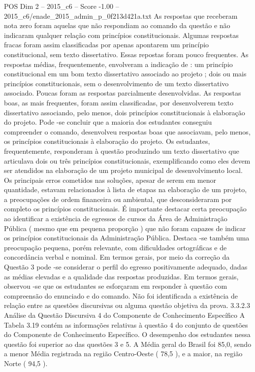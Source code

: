 \begin{textsample}{POS Dim 2 – 2015\_c6 – Score -1.00 – 2015\_c6/enade\_2015\_admin\_p\_0f213d421a.txt}
As respostas que receberam nota zero foram aquelas que não respondiam ao comando da questão e não indicaram qualquer relação com princípios constitucionais.
Algumas respostas fracas foram assim classificadas por apenas apontarem um princípio constitucional, sem texto dissertativo.
Essas repostas foram pouco frequentes.
As respostas médias, frequentemente, envolveram a indicação de : um princípio constitucional em um bom texto dissertativo associado ao projeto ; dois ou mais princípios constitucionais, sem o desenvolvimento de um texto dissertativo associado.
Poucas foram as respostas parcialmente desenvolvidas.
As respostas boas, as mais frequentes, foram assim classificadas, por desenvolverem texto dissertativo associando, pelo menos, dois princípios constitucionais à elaboração do projeto.
Pode -se concluir que a maioria dos estudantes conseguiu compreender o comando, desenvolveu respostas boas que associavam, pelo menos, os princípios constitucionais à elaboração do projeto.
Os estudantes, frequentemente, responderam à questão produzindo um texto dissertativo que articulava dois ou três princípios constitucionais, exemplificando como eles devem ser atendidos na elaboração de um projeto municipal de desenvolvimento local.
Os principais erros cometidos nas soluções, apesar de serem em menor quantidade, estavam relacionados à lista de etapas na elaboração de um projeto, a preocupações de ordem financeira ou ambiental, que desconsideraram por completo os princípios constitucionais.
É importante destacar certa preocupação ao identificar a existência de egressos de cursos da Área de Administração Pública ( mesmo que em pequena proporção ) que não foram capazes de indicar os princípios constitucionais da Administração Pública.
Destaca -se também uma preocupação pequena, porém relevante, com dificuldades ortográficas e de concordância verbal e nominal.
Em termos gerais, por meio da correção da Questão 3 pode -se considerar o perfil do egresso positivamente adequado, dadas as médias elevadas e a qualidade das respostas produzidas.
Em termos gerais, observou -se que os estudantes se esforçaram em responder à questão com compreensão do enunciado e do comando.
Não foi identificada a existência de relação entre as questões discursivas ou alguma questão objetiva da prova. 3.3.2.3 Análise da Questão Discursiva 4 do Componente de Conhecimento Específico A Tabela 3.19 contém as informações relativas à questão 4 do conjunto de questões do Componente de Conhecimento Específico.
O desempenho dos estudantes nessa questão foi superior ao das questões 3 e 5.
A Média geral do Brasil foi 85,0, sendo a menor Média registrada na região Centro-Oeste ( 78,5 ), e a maior, na região Norte ( 94,5 ).

\end{textsample}
